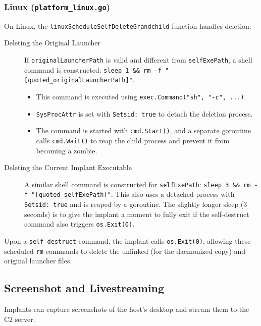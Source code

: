 \subsubsection{Linux (\texttt{platform\_linux.go})}
On Linux, the \texttt{linuxScheduleSelfDeleteGrandchild} function handles deletion:
\begin{description}
    \item[Deleting the Original Launcher] If \texttt{originalLauncherPath} is valid and different from \texttt{selfExePath}, a shell command is constructed: \verb|sleep 1 && rm -f "[quoted_originalLauncherPath]"|.
        \begin{itemize}
            \item This command is executed using \texttt{exec.Command("sh", "-c", ...)}.
            \item \texttt{SysProcAttr} is set with \texttt{Setsid: true} to detach the deletion process.
            \item The command is started with \texttt{cmd.Start()}, and a separate goroutine calls \texttt{cmd.Wait()} to reap the child process and prevent it from becoming a zombie.
        \end{itemize}
    \item[Deleting the Current Implant Executable] A similar shell command is constructed for \texttt{selfExePath}: \verb|sleep 3 && rm -f "[quoted_selfExePath]"|. This also uses a detached process with \texttt{Setsid: true} and is reaped by a goroutine. The slightly longer sleep (3 seconds) is to give the implant a moment to fully exit if the self-destruct command also triggers \texttt{os.Exit(0)}.
\end{description}
Upon a \texttt{self\_destruct} command, the implant calls \texttt{os.Exit(0)}, allowing these scheduled \texttt{rm} commands to delete the unlinked (for the daemonized copy) and original launcher files.

\subsection{Screenshot and Livestreaming}
Implants can capture screenshots of the host's desktop and stream them to the C2 server.

